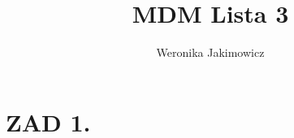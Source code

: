 \documentclass{article}[13pt]
\author{Weronika Jakimowicz}
\title{MDM Lista 3}
\date{}
\begin{document}
    \maketitle

    \section*{ZAD 1.}
    
\end{document}
